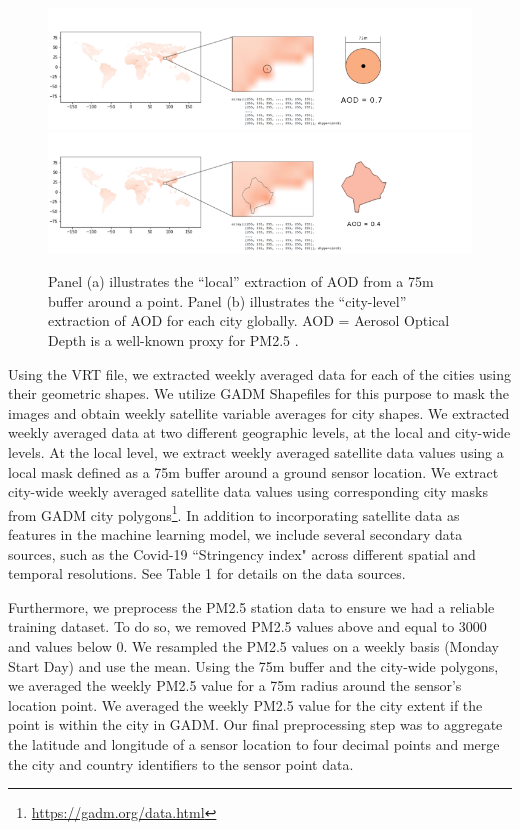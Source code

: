 \begin{figure}[t]
    \centering
    \includegraphics[width=\linewidth]{2step1.png}
    \includegraphics[width=\linewidth]{2step2.png}
    \caption{Panel (a) illustrates the ``local” extraction of AOD from a 75m buffer around a point. Panel (b) illustrates the “city-level” extraction of AOD for each city globally. AOD = Aerosol Optical Depth is a well-known proxy for PM2.5 \cite{Kumar}.
}
    \label{fig:2step}
\end{figure}

Using the VRT file, we extracted weekly averaged data for each of the cities using their geometric shapes. We utilize GADM Shapefiles for this purpose to mask the images and obtain weekly satellite variable averages for city shapes. We extracted weekly averaged data at two different geographic levels, at the local and city-wide levels. At the local level, we extract weekly averaged satellite data values using a local mask defined as a 75m buffer around a ground sensor location. We extract city-wide weekly averaged satellite data values using corresponding city masks from GADM city polygons\footnote{\url{https://gadm.org/data.html}}. In addition to incorporating satellite data as features in the machine learning model, we include several secondary data sources, such as the Covid-19 ``Stringency index" across different spatial and temporal resolutions. See Table 1 for details on the data sources.

Furthermore, we preprocess the PM2.5 station data to ensure we had a reliable training dataset. To do so, we removed PM2.5 values above and equal to 3000 and values below 0. We resampled the PM2.5 values on a weekly basis (Monday Start Day) and use the mean. Using the 75m buffer and the city-wide polygons, we averaged the weekly PM2.5 value for a 75m radius around the sensor’s location point. We averaged the weekly PM2.5 value for the city extent if the point is within the city in GADM. Our final preprocessing step was to aggregate the latitude and longitude of a sensor location to four decimal points and merge the city and country identifiers to the sensor point data.

